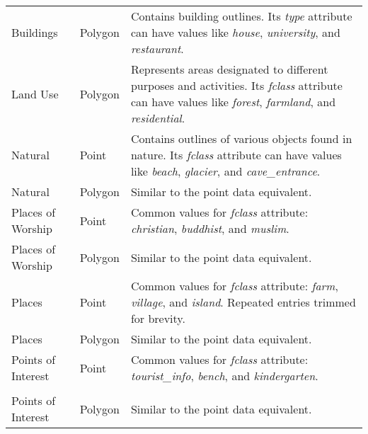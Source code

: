 \begin{longtable}{p{3cm}p{2.3cm}p{8cm}}
    Buildings          & Polygon            & Contains building outlines. Its \emph{type} attribute can have values like \emph{house}, \emph{university}, and \emph{restaurant}.                                                  \\
    Land Use           & Polygon            & Represents areas designated to different purposes and activities. Its \emph{fclass} attribute can have values like \emph{forest}, \emph{farmland}, and \emph{residential}.          \\
    Natural            & Point              & Contains outlines of various objects found in nature. Its \emph{fclass} attribute can have values like \emph{beach}, \emph{glacier}, and \emph{cave\_entrance}.                     \\
    Natural            & Polygon            & Similar to the point data equivalent.                                                                                                                                               \\
    Places of Worship  & Point              & Common values for \emph{fclass} attribute: \emph{christian}, \emph{buddhist}, and \emph{muslim}.                                                                                    \\
    Places of Worship  & Polygon            & Similar to the point data equivalent.                                                                                                                                               \\
    Places             & Point              & Common values for \emph{fclass} attribute: \emph{farm}, \emph{village}, and \emph{island}. Repeated entries trimmed for brevity.                                                    \\
    Places             & Polygon            & Similar to the point data equivalent.                                                                                                                                               \\
    Points of Interest & Point              & Common values for \emph{fclass} attribute: \emph{tourist\_info}, \emph{bench}, and \emph{kindergarten}.                                                                             \\                                                                                                                                        \\
    Points of Interest & Polygon            & Similar to the point data equivalent.                                                                                                                                               \\

\end{longtable}
